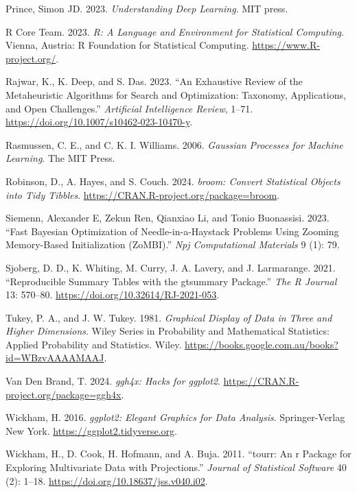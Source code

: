 \documentclass[
  12pt,
]{interact}
\newlength{\cslhangindent}
\newenvironment{CSLReferences}[2] %
 {\begin{list}{}{%
  \setlength{\itemindent}{0pt}
  \setlength{\leftmargin}{0pt}
  \setlength{\parsep}{0pt}
  \ifodd #1
   \setlength{\leftmargin}{\cslhangindent}
   \setlength{\itemindent}{-1\cslhangindent}
  \fi
  \setlength{\itemsep}{#2\baselineskip}}}
 {\end{list}}
\theoremstyle{plain}
\begin{document}
\begin{CSLReferences}{1}{0}
Prince, Simon JD. 2023. \emph{Understanding Deep Learning}. MIT press.

R Core Team. 2023. \emph{R: A Language and Environment for Statistical
Computing}. Vienna, Austria: R Foundation for Statistical Computing.
\url{https://www.R-project.org/}.

Rajwar, K., K. Deep, and S. Das. 2023. {``An Exhaustive Review of the
Metaheuristic Algorithms for Search and Optimization: Taxonomy,
Applications, and Open Challenges.''} \emph{Artificial Intelligence
Review}, 1--71. \url{https://doi.org/10.1007/s10462-023-10470-y}.

Rasmussen, C. E., and C. K. I. Williams. 2006. \emph{Gaussian Processes
for Machine Learning}. The MIT Press.

Robinson, D., A. Hayes, and S. Couch. 2024. \emph{{b}room: Convert
Statistical Objects into Tidy Tibbles}.
\url{https://CRAN.R-project.org/package=broom}.

Siemenn, Alexander E, Zekun Ren, Qianxiao Li, and Tonio Buonassisi.
2023. {``Fast Bayesian Optimization of Needle-in-a-Haystack Problems
Using Zooming Memory-Based Initialization (ZoMBI).''} \emph{Npj
Computational Materials} 9 (1): 79.

Sjoberg, D. D., K. Whiting, M. Curry, J. A. Lavery, and J. Larmarange.
2021. {``Reproducible Summary Tables with the {g}tsummary Package.''}
\emph{{The R Journal}} 13: 570--80.
\url{https://doi.org/10.32614/RJ-2021-053}.

Tukey, P. A., and J. W. Tukey. 1981. \emph{Graphical Display of Data in
Three and Higher Dimensions}. Wiley Series in Probability and
Mathematical Statistics: Applied Probability and Statistics. Wiley.
\url{https://books.google.com.au/books?id=WBzvAAAAMAAJ}.

Van Den Brand, T. 2024. \emph{{g}gh4x: Hacks for {ggplot2}}.
\url{https://CRAN.R-project.org/package=ggh4x}.

Wickham, H. 2016. \emph{{g}gplot2: Elegant Graphics for Data Analysis}.
Springer-Verlag New York. \url{https://ggplot2.tidyverse.org}.

Wickham, H., D. Cook, H. Hofmann, and A. Buja. 2011. {``{t}ourr: An r
Package for Exploring Multivariate Data with Projections.''}
\emph{Journal of Statistical Software} 40 (2): 1--18.
\url{https://doi.org/10.18637/jss.v040.i02}.


\end{CSLReferences}
\end{document}
